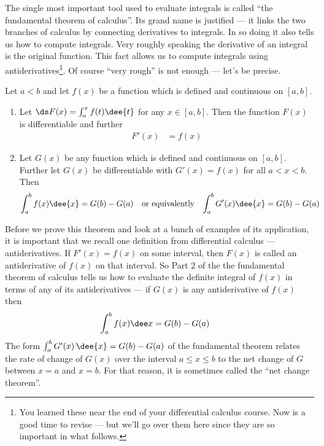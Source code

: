 The single most important tool used to evaluate integrals is called
``the fundamental theorem of calculus''. Its grand name is justified --- it
links the two branches of calculus by connecting derivatives to integrals. In
so
doing it also tells us how to compute integrals. Very roughly speaking the
derivative of an integral is the original function. This fact allows us to
compute integrals using antiderivatives\footnote{You learned these near the
end of your differential calculus course. Now is a good time to revise ---
but we'll go over them here since they are so important in what follows.}. Of
course ``very rough'' is not enough --- let's be precise.
\begin{theorem}\label{thm:INTfundthmofcalc}
Let $a<b$ and let $f(x)$ be a function which is defined and continuous on
$[a,b]$.
\begin{enumerate}
 \item Let $\ds F(x)=\int_a^x f(t)\dee{t}$ for any $x
\in[a,b]$. Then the function $F(x)$ is differentiable and further
\begin{align*}
 F'(x) &=f(x)
\end{align*}

\item Let $G(x)$ be any function which is defined and
continuous on $[a,b]$. Further let $G(x)$ be differentiable with $G'(x)=f(x)$
for all $a<x<b$. Then
\begin{align*}
\int_a^b f(x)\dee{x} &=G(b)-G(a) & \text{or equivalently} &&
\int_a^b G'(x)\dee{x} &=G(b)-G(a)
\end{align*}
\end{enumerate}
\end{theorem}

Before we prove this theorem and look at a bunch of examples of its
application, it is important that we recall one definition from differential
calculus --- antiderivatives. If $F'(x) = f(x)$ on some interval, then  $F(x)$
is called an antiderivative of $f(x)$ on that interval. So Part 2 of the the
fundamental theorem of calculus tells us how to evaluate the definite integral
of $f(x)$ in terms of any of its antiderivatives ---  if  $G(x)$ is any
antiderivative of $f(x)$ then
\begin{align*}
\int_a^b f(x) \dee x &= G(b)-G(a)
\end{align*}
The form $\int_a^b G'(x)\,\dee{x} = G(b) - G(a)$ of the fundamental theorem relates the
rate of change of $G(x)$ over the interval $a\le x\le b$ to the net change of $G$ between
$x=a$ and $x=b$. For that reason, it is sometimes called the ``net change theorem''.

